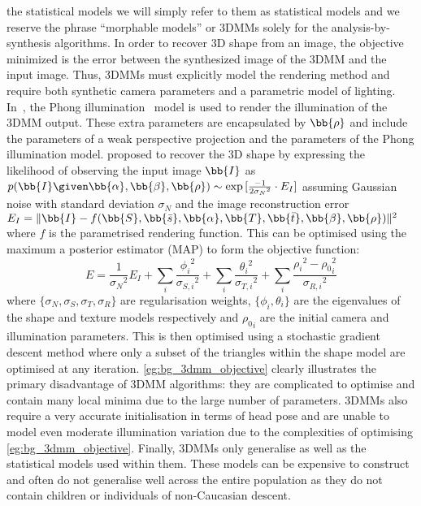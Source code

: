 the statistical models we will simply refer to them as statistical models and
we reserve the phrase ``morphable models'' or 3DMMs solely for the
analysis-by-synthesis algorithms. In order to recover 3D shape from an image,
the objective minimized is the error between the synthesized image of the
3DMM and the input image. Thus, 3DMMs must explicitly model the rendering
method and require both synthetic camera parameters and a parametric model
of lighting. In~\cite{volker1999morphable},
the Phong illumination~\cite{tuong1973illumination} model is used to render
the illumination of the 3DMM output. These extra parameters are encapsulated
by $\bb{\rho}$ and include the parameters of a weak perspective projection
and the parameters of the Phong illumination model.
\citet{volker1999morphable} proposed to recover the 3D shape by expressing
the likelihood of observing the input image $\bb{I}$ as
$p(\bb{I} \given \bb{\alpha},\bb{\beta},\bb{\rho}) \sim \exp{[\frac{-1}{2{\sigma_N}^2} \cdot E_I]}$
assuming Gaussian noise with standard deviation $\sigma_N$ and the image
reconstruction error $E_I = \lVert \bb{I} - f(\bb{S}, \bb{\bar{s}}, \bb{\alpha}, \bb{T}, \bb{\bar{t}}, \bb{\beta}, \bb{\rho}) \rVert^2$ where $f$ is the parametrised rendering function. This
can be optimised using the maximum a posterior estimator (MAP) to form
the objective function:
\begin{equation}\label{eg:bg_3dmm_objective}
	E = \frac{1}{{\sigma_N}^2} E_I + \sum_i \frac{{\phi_i}^2}{{\sigma_{S,i}}^2} + \sum_i \frac{{\theta_i}^2}{{\sigma_{T,i}}^2} + \sum_i \frac{{\rho_i}^2 - {\rho_0}_i^2}{{\sigma_{R,i}}^2}
\end{equation}
where $\{\sigma_N,\sigma_S,\sigma_T,\sigma_R\}$ are regularisation weights,
$\{\phi_i, \theta_i \}$ are the eigenvalues of the shape and texture models
respectively and ${\rho_0}_i$ are the initial camera and illumination parameters.
This is then optimised using a stochastic gradient descent method where
only a subset of the triangles within the shape model are optimised at any
iteration. \cref{eg:bg_3dmm_objective} clearly illustrates the primary
disadvantage of 3DMM algorithms: they are complicated to optimise and contain
many local minima due to the large number of parameters. 3DMMs also require
a very accurate initialisation in terms of head pose and are unable to model
even moderate illumination variation due to the complexities of optimising
\cref{eg:bg_3dmm_objective}. Finally, 3DMMs only generalise as well as the
statistical models used within them. These models can be expensive to
construct and often do not generalise well across the entire population as
they do not contain children or individuals of non-Caucasian descent.

